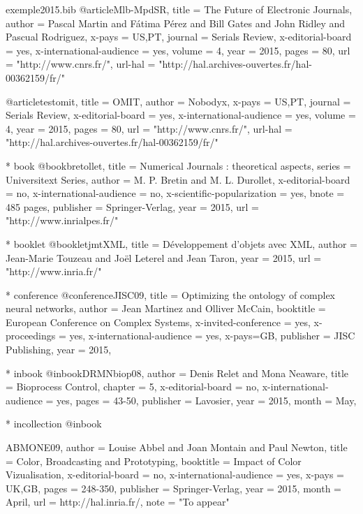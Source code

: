 \documentclass{ra2015}
\begin{document}
\begin{filecontents+}{exemple2015.bib}
@article{Mlb-MpdSR,
title = {The Future of Electronic Journals},
author = {Pascal Martin and Fátima Pérez and Bill Gates and John Ridley and Pascual Rodriguez},
x-pays = {US,PT},
journal = {Serials Review}, 
x-editorial-board = {yes}, 
x-international-audience = {yes}, 
volume = 4, 
year = 2015, 
pages = 80, 
url =  "http://www.cnrs.fr/",
url-hal = "http://hal.archives-ouvertes.fr/hal-00362159/fr/"
} 

@article{testomit,
title = {OMIT},
author = {Nobodyx},
x-pays = {US,PT},
journal = {Serials Review}, 
x-editorial-board = {yes}, 
x-international-audience = {yes}, 
volume = 4, 
year = 2015, 
pages = 80, 
url =  "http://www.cnrs.fr/",
url-hal = "http://hal.archives-ouvertes.fr/hal-00362159/fr/"
} 


    * book
@book{bretollet,
title = {Numerical Journals : theoretical aspects}, 
series = {Universitext Series}, 
author = {M. P. Bretin and M. L. Durollet}, 
x-editorial-board = {no}, 
x-international-audience = {no}, 
x-scientific-popularization = {yes}, 
bnote = {485 pages}, 
publisher = {Springer-Verlag}, 
year = 2015, 
url = "http://www.inrialpes.fr/"
}


    * booklet
@booklet{jmtXML,
title = {Développement d'objets avec XML}, 
author = {Jean-Marie Touzeau and Joël Leterel and Jean Taron}, 
year = 2015, 
url =  "http://www.inria.fr/"
}
	
	
    * conference
@conference{JISC09,
title = {Optimizing the ontology of complex neural networks}, 
author = {Jean Martinez and Olliver McCain}, 
booktitle = {European Conference on Complex Systems}, 
x-invited-conference = {yes}, 
x-proceedings = {yes}, 
x-international-audience = {yes}, 
x-pays={GB},
publisher = {JISC Publishing}, 
year = 2015, 
}


    * inbook
@inbook{DRMNbiop08,
author = {Denis Relet and Mona Neaware}, 
title = {Bioprocess Control}, 
chapter = {5}, 
x-editorial-board = {no}, 
x-international-audience = {yes}, 
pages = {43-50}, 
publisher = {Lavosier}, 
year = 2015, 
month = {May}, 
}


	* incollection
@inbook{ABMONE09,
author = {Louise Abbel and Joan Montain and Paul Newton}, 
title = {Color, Broadcasting and Prototyping}, 
booktitle = {Impact of Color Vizualisation}, 
x-editorial-board = {no}, 
x-international-audience = {yes}, 
x-pays = {UK,GB},
pages = {248-350}, 
publisher = {Springer-Verlag}, 
year = 2015, 
month = {April},
url = {http://hal.inria.fr/}, 
note = "To appear"

}
\end{filecontents+}
\end{document}
